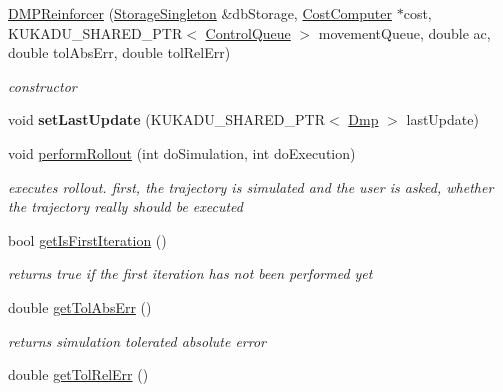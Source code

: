 \begin{DoxyCompactItemize}
\item 
\hyperlink{classkukadu_1_1DMPReinforcer_a59e44d8e092d40a1db9a8a14f7628e05}{D\+M\+P\+Reinforcer} (\hyperlink{classkukadu_1_1StorageSingleton}{Storage\+Singleton} \&db\+Storage, \hyperlink{classkukadu_1_1CostComputer}{Cost\+Computer} $\ast$cost, K\+U\+K\+A\+D\+U\+\_\+\+S\+H\+A\+R\+E\+D\+\_\+\+P\+TR$<$ \hyperlink{classkukadu_1_1ControlQueue}{Control\+Queue} $>$ movement\+Queue, double ac, double tol\+Abs\+Err, double tol\+Rel\+Err)
\begin{DoxyCompactList}\small\item\em constructor \end{DoxyCompactList}\item 
void {\bfseries set\+Last\+Update} (K\+U\+K\+A\+D\+U\+\_\+\+S\+H\+A\+R\+E\+D\+\_\+\+P\+TR$<$ \hyperlink{classkukadu_1_1Dmp}{Dmp} $>$ last\+Update)\hypertarget{classkukadu_1_1DMPReinforcer_a759bd3c0954e4287f8166a4115fd2c55}{}\label{classkukadu_1_1DMPReinforcer_a759bd3c0954e4287f8166a4115fd2c55}

\item 
void \hyperlink{classkukadu_1_1DMPReinforcer_ab2597f0265192981ab70cadc9fa35a05}{perform\+Rollout} (int do\+Simulation, int do\+Execution)
\begin{DoxyCompactList}\small\item\em executes rollout. first, the trajectory is simulated and the user is asked, whether the trajectory really should be executed \end{DoxyCompactList}\item 
bool \hyperlink{classkukadu_1_1DMPReinforcer_ab9ba3dc996de2223db6fb8d0dd79c429}{get\+Is\+First\+Iteration} ()\hypertarget{classkukadu_1_1DMPReinforcer_ab9ba3dc996de2223db6fb8d0dd79c429}{}\label{classkukadu_1_1DMPReinforcer_ab9ba3dc996de2223db6fb8d0dd79c429}

\begin{DoxyCompactList}\small\item\em returns true if the first iteration has not been performed yet \end{DoxyCompactList}\item 
double \hyperlink{classkukadu_1_1DMPReinforcer_a9b75bfd5aefec6e93dd6ac6a130da023}{get\+Tol\+Abs\+Err} ()\hypertarget{classkukadu_1_1DMPReinforcer_a9b75bfd5aefec6e93dd6ac6a130da023}{}\label{classkukadu_1_1DMPReinforcer_a9b75bfd5aefec6e93dd6ac6a130da023}

\begin{DoxyCompactList}\small\item\em returns simulation tolerated absolute error \end{DoxyCompactList}\item 
double \hyperlink{classkukadu_1_1DMPReinforcer_a377d0dc8df73872a2d4c10e8247b0862}{get\+Tol\+Rel\+Err} ()\hypertarget{classkukadu_1_1DMPReinforcer_a377d0dc8df73872a2d4c10e8247b0862}{}\label{classkukadu_1_1DMPReinforcer_a377d0dc8df73872a2d4c10e8247b0862}


\end{DoxyCompactItemize}
